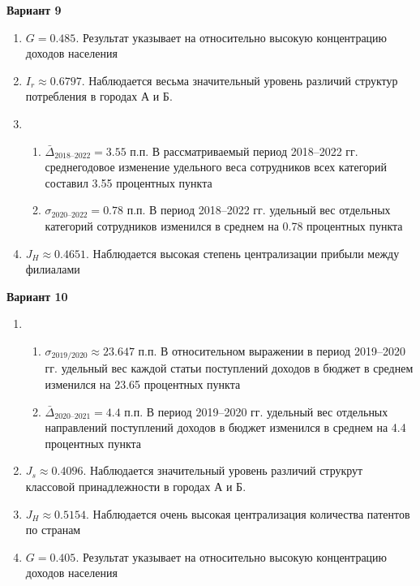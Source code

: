 \documentclass{article}
\begin{document}
\textbf{Вариант 9}
\begin{enumerate}
\item $G= 0.485$. Результат указывает на относительно высокую концентрацию доходов населения
\item $I_r\approx 0.6797$. Наблюдается весьма значительный уровень различий структур потребления в городах А и Б.
\item \begin{enumerate} \item $\bar\Delta_\text{2018--2022}= 3.55$ п.п. В рассматриваемый период 2018--2022 гг. среднегодовое изменение удельного веса сотрудников всех категорий составил 3.55 процентных пункта
\item $\sigma_\text{2020--2022}= 0.78$ п.п. В период 2018--2022 гг. удельный вес отдельных категорий сотрудников изменился в среднем на 0.78 процентных пункта\end{enumerate}
\item $J_H \approx 0.4651$. Наблюдается высокая степень централизации прибыли между филиалами
\end{enumerate}

\textbf{Вариант 10}
\begin{enumerate}
\item \begin{enumerate} \item $\sigma_\text{2019/2020}\approx 23.647$ п.п. В относительном выражении в период 2019--2020 гг. удельный вес каждой статьи поступлений доходов в бюджет в среднем изменился на 23.65 процентных пункта
\item $\bar\Delta_\text{2020--2021}= 4.4$ п.п. В период 2019--2020 гг. удельный вес отдельных направлений поступлений доходов в бюджет изменился в среднем на 4.4 процентных пункта\end{enumerate}
\item $J_s\approx 0.4096$. Наблюдается значительный уровень различий струкрут классовой принадлежности в городах А и Б.
\item $J_H \approx 0.5154$. Наблюдается очень высокая централизация количества патентов по странам
\item $G= 0.405$. Результат указывает на относительно высокую концентрацию доходов населения
\end{enumerate}
\end{document}
